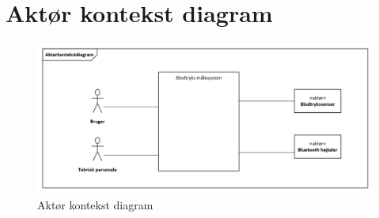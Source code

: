\section{Aktør kontekst diagram}
\vspace{0.8 cm}

\begin{figure}[h!]
	\centering
	\includegraphics[width=0.75\linewidth]{FunktionelleKrav/Aktoer_kontekst_diagram}
	\caption{Aktør kontekst diagram}
	\label{fig:Aktoer_kontekst_diagram}
\end{figure}